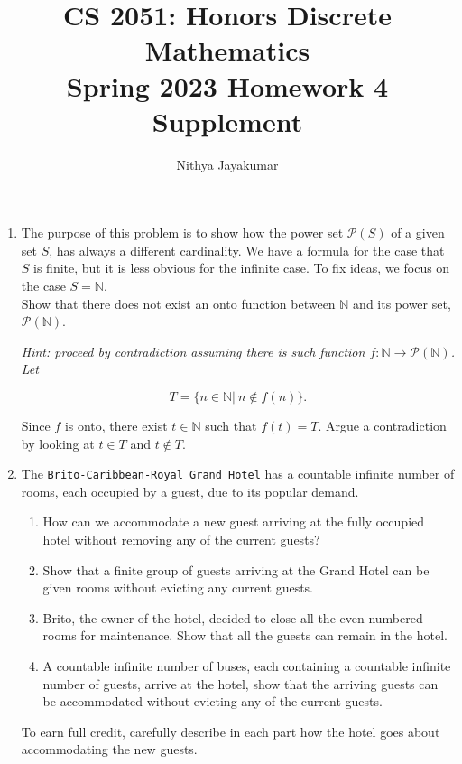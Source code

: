 \documentclass{article}
\title{\vspace{-1cm}CS 2051: Honors Discrete Mathematics \\Spring 2023 Homework 4 Supplement}
\author{Nithya Jayakumar }
\date{}
\begin{document}
\maketitle
\begin{enumerate}

\item The purpose of this problem is to show how the power set $\mathcal{P}(S)$ of a given set $S$, has always a different cardinality. We have a formula for the case that $S$ is finite, but it is less obvious for the infinite case. To fix ideas, we focus on the case $S=\mathbb{N}$.\\

Show that there does not exist an onto function between $\mathbb{N}$ and its power set, $\mathcal{P}(\mathbb{N})$.\\

 {\it Hint: proceed by contradiction assuming there is such function $f:\mathbb{N} \rightarrow \mathcal{P}(\mathbb{N})$. Let 
 
 \[
 T=\{n\in \mathbb{N}|~n\notin f(n) \}.
 \]

Since $f$ is onto, there exist $t\in \mathbb{N}$ such that $f(t)=T$. Argue a contradiction by looking at $t\in T$ and $t\notin T$.}

\item The {\tt Brito-Caribbean-Royal Grand Hotel} has a countable infinite number of rooms, each occupied by a guest, due to its popular demand.

\begin{enumerate}
    \item  How can we accommodate a new guest arriving at the fully occupied hotel without removing any of the current guests?
    \item Show that a finite group of guests arriving at the Grand Hotel can be given rooms without evicting any current guests.
    \item Brito, the owner of the hotel, decided to close all the even numbered rooms for maintenance. Show that all the guests can remain in the hotel.
    \item A countable infinite number of buses, each containing a countable infinite number of guests, arrive at the hotel, show that the arriving guests can be accommodated without evicting any of the current guests.
    \end{enumerate}

To earn full credit, carefully describe in each part how the hotel goes about accommodating the new guests.

\end{enumerate}
\end{document}
